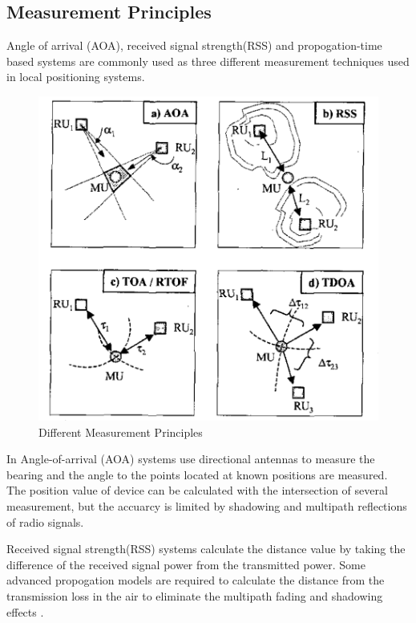 \subsection{Measurement Principles} \label{sssec:num1}

Angle of arrival (AOA), received signal strength(RSS) and propogation-time based systems are commonly used as three different measurement techniques used in local positioning systems. 

\begin{figure}[H]
	\caption{Different Measurement Principles \cite{20}}
	\centering
	\includegraphics[scale = 0.4]{measurement}
\end{figure} 

In Angle-of-arrival (AOA) systems use directional antennas to measure the bearing and the angle to the points located at known positions are measured. The position value of device can be calculated with the intersection of several measurement, but the accuarcy is limited by shadowing and multipath reflections of radio signals. 

Received signal strength(RSS) systems calculate the distance value by taking the difference of the received signal power from the transmitted power. Some advanced propogation models are required to calculate the distance from the transmission loss in the air to eliminate the multipath fading and shadowing effects \cite{21}. 

